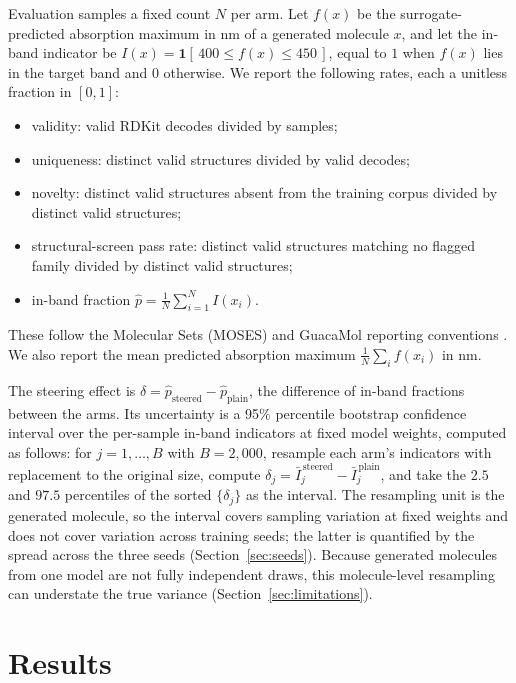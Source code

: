 \documentclass[11pt]{article}
\begin{document}
Evaluation samples a fixed count $N$ per arm. Let $f(x)$ be the surrogate-predicted
absorption maximum in nm of a generated molecule $x$, and let the in-band indicator be
$I(x) = \mathbf{1}[\,400 \le f(x) \le 450\,]$, equal to $1$ when $f(x)$ lies in the target
band and $0$ otherwise. We report the following rates, each a unitless fraction in
$[0,1]$:
\begin{itemize}
  \item validity: valid RDKit decodes divided by samples;
  \item uniqueness: distinct valid structures divided by valid decodes;
  \item novelty: distinct valid structures absent from the training corpus divided by
  distinct valid structures;
  \item structural-screen pass rate: distinct valid structures matching no flagged family
  divided by distinct valid structures;
  \item in-band fraction $\hat{p} = \frac{1}{N}\sum_{i=1}^{N} I(x_i)$.
\end{itemize}
These follow the Molecular Sets (MOSES) and GuacaMol reporting conventions
\cite{polykovskiy2020moses, brown2019guacamol}. We also report the mean predicted
absorption maximum $\frac{1}{N}\sum_{i} f(x_i)$ in nm.

The steering effect is $\delta = \hat{p}_{\mathrm{steered}} - \hat{p}_{\mathrm{plain}}$,
the difference of in-band fractions between the arms. Its uncertainty is a 95\% percentile
bootstrap confidence interval over the per-sample in-band indicators at fixed model
weights, computed as follows: for $j = 1,\dots,B$ with $B = 2{,}000$, resample each arm's
indicators with replacement to the original size, compute
$\delta_j = \bar{I}^{\,\mathrm{steered}}_j - \bar{I}^{\,\mathrm{plain}}_j$, and take the
$2.5$ and $97.5$ percentiles of the sorted $\{\delta_j\}$ as the interval. The resampling
unit is the generated molecule, so the interval covers sampling variation at fixed weights
and does not cover variation across training seeds; the latter is quantified by the
spread across the three seeds (Section~\ref{sec:seeds}). Because generated molecules from one model are not fully
independent draws, this molecule-level resampling can understate the true variance
(Section~\ref{sec:limitations}).

\section{Results}
\label{sec:results}
\end{document}
